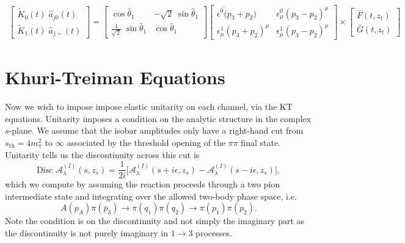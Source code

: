 \documentclass[10pt, aps,prd,amsmath,amssymb,superscriptaddress,onecolumn,
nofootinbib,showpacs,preprintnumbers]{revtex4-1}
\newcommand{\Disc}{\text{Disc }}
\begin{document}
\begin{align}
  \begin{bmatrix}
  \tilde{K}_{0}(t) \; \hat{a}_{j0}(t) \\
    \tilde{K}_{1}(t) \; \hat{a}_{j+}(t)
  \end{bmatrix}
  =
  \begin{bmatrix}
      \cos \hat{\theta}_1  & - \sqrt{2} \; \sin \hat{\theta}_1  \\
     \frac{1}{\sqrt{2}}  \; \sin \hat{\theta}_1  & \cos \hat{\theta}_1
  \end{bmatrix}
  \begin{bmatrix}
    \epsilon^0 \dot (p_3 + p_2) & \epsilon_\mu^0 (p_3 - p_2)^\mu \\
  \epsilon_\mu^1  (p_3 + p_2)^\mu & \epsilon_\mu^1 (p_3 - p_2)^\mu
  \end{bmatrix}
  \times
  \begin{bmatrix}
    \bar{F}(t,z_t) \\
     \bar{G}(t,z_t)
  \end{bmatrix}
\end{align}
\section{Khuri-Treiman Equations} \label{sec:unitarity}

Now we wish to impose impose elastic unitarity on each channel, via the KT equations.
Unitarity imposes a condition on the analytic structure in the complex \(s\)-plane. We assume that the isobar amplitudes only have a right-hand cut from \(s_\text{th} = 4m_\pi^2\) to \(\infty\) associated by the threshold opening of the \(\pi\pi\) final state. Unitarity tells us the discontinuity across this cut is
  \begin{equation}
      \Disc \mathcal{A}^{(I)}_\lambda(s,z_s) = \frac{1}{2i} \bigg[ \mathcal{A}^{(I)}_\lambda(s + i\epsilon, z_s) - \mathcal{A}^{(I)}_\lambda(s-i\epsilon,z_s) \bigg],
  \end{equation}
which we compute by assuming the reaction proceeds through a two pion intermediate state and integrating over the allowed two-body phase space, i.e.
  \begin{equation}
    A(p_A) \pi(\overline{p}_3) \rightarrow \pi(q_1)\pi(q_2) \to \pi(p_1) \pi(p_2).
  \end{equation}
Note the condition is on the discontinuity and not simply the imaginary part as the discontinuity is not purely imaginary in \(1 \to 3\) processes.
\end{document}
